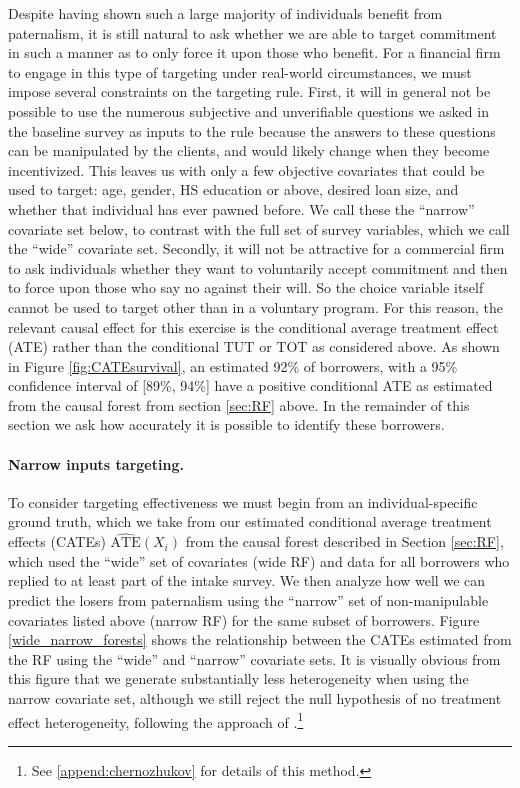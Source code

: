 \documentclass[oneside,11pt]{article}
\begin{document}
Despite having shown such a large majority of individuals benefit from paternalism, it is still natural to ask whether we are able to target commitment in such a manner as to only force it upon those who benefit. For a financial firm to engage in this type of targeting under real-world circumstances, we must impose several constraints on the targeting rule.  First, it will in general not be possible to use the numerous subjective and unverifiable questions we asked in the baseline survey as inputs to the rule because the answers to these questions can be manipulated by the clients, and would likely change when they become incentivized. This leaves us with only a few objective covariates that could be used to target: age, gender, HS education or above, desired loan size, and whether that individual has ever pawned before. 
We call these the ``narrow'' covariate set below, to contrast with the full set of survey variables, which we call the ``wide'' covariate set.
Secondly, it will not be attractive for a commercial firm to ask individuals whether they want to voluntarily accept commitment and then to force upon those who say no against their will. So the choice variable itself cannot be used to target other than in a voluntary program. 
For this reason, the relevant causal effect for this exercise is the conditional average treatment effect (ATE) rather than the conditional TUT or TOT as considered above.
As shown in Figure \ref{fig:CATEsurvival}, an estimated 92\% of borrowers, with a 95\% confidence interval of [89\%, 94\%] have a positive conditional ATE as estimated from the causal forest from section \ref{sec:RF} above.
In the remainder of this section we ask how accurately it is possible to identify these borrowers. 

\paragraph{Narrow inputs targeting.} To  consider targeting effectiveness we must begin from an individual-specific ground truth, which we take from our estimated conditional average treatment effects (CATEs) $\widehat{\text{ATE}}(X_i)$ from the causal forest described in Section \ref{sec:RF},  which used the ``wide'' set of covariates (wide RF) and data for all borrowers who replied to at least part of the intake survey. We then analyze how well we can predict the losers from paternalism using the ``narrow'' set of non-manipulable covariates listed above (narrow RF) for the same subset of borrowers.
Figure \ref{wide_narrow_forests} shows the relationship between the CATEs estimated from the RF using the ``wide'' and ``narrow'' covariate sets.  It is visually obvious from this figure that we generate substantially less heterogeneity when using the narrow covariate set, although we still reject the null hypothesis of no treatment effect heterogeneity, following the approach of \cite{chernozhukov2018generic}.\footnote{See \ref{append:chernozhukov} for details of this method.}
\end{document}
